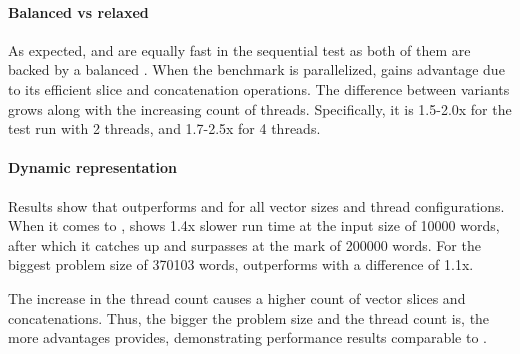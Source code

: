 \paragraph{Balanced vs relaxed}
As expected, \rbvec{} and \rrbvec{} are equally fast in the sequential test as both of them are backed by a balanced \rbtree{}. When the benchmark is parallelized, \rrbvec{} gains advantage due to its efficient slice and concatenation operations. The difference between variants grows along with the increasing count of threads. Specifically, it is 1.5-2.0x for the test run with 2 threads, and 1.7-2.5x for 4 threads.

\paragraph{Dynamic representation}
Results show that \pvec{} outperforms \rbvec{} and \rrbvec{} for all vector sizes and thread configurations. When it comes to \stdvec{}, \pvec{} shows 1.4x slower run time at the input size of 10000 words, after which it catches up and surpasses \stdvec{} at the mark of 200000 words. For the biggest problem size of 370103 words, \pvec{} outperforms \stdvec{} with a difference of 1.1x.

The increase in the thread count causes a higher count of vector slices and concatenations. Thus, the bigger the problem size and the thread count is, the more advantages \pvec{} provides, demonstrating performance results comparable to \stdvec{}.

